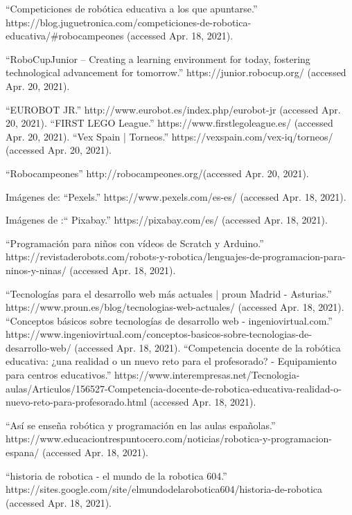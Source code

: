 \begin{thebibliography}{69}
	``Competiciones de robótica educativa a los que apuntarse.” https://blog.juguetronica.com/competiciones-de-robotica-educativa/\#robocampeones (accessed Apr. 18, 2021).

 ``RoboCupJunior – Creating a learning environment for today, fostering technological advancement for tomorrow.” https://junior.robocup.org/ (accessed Apr. 20, 2021).

	``EUROBOT JR.” http://www.eurobot.es/index.php/eurobot-jr (accessed Apr. 20, 2021).
 ``FIRST LEGO League.” https://www.firstlegoleague.es/ (accessed Apr. 20, 2021).
 ``Vex Spain | Torneos.” https://vexspain.com/vex-iq/torneos/ (accessed Apr. 20, 2021).

 ``Robocampeones”
http://robocampeones.org/(accessed Apr. 20, 2021).

 Imágenes de:	``Pexels.” https://www.pexels.com/es-es/ (accessed Apr. 18, 2021).

 Imágenes de :`` Pixabay.” https://pixabay.com/es/ (accessed Apr. 18, 2021).

\bibitem{}	``Programación para niños con vídeos de Scratch y Arduino.” https://revistaderobots.com/robots-y-robotica/lenguajes-de-programacion-para-ninos-y-ninas/ (accessed Apr. 18, 2021).

\bibitem{}	``Tecnologías para el desarrollo web más actuales | proun Madrid - Asturias.” https://www.proun.es/blog/tecnologias-web-actuales/ (accessed Apr. 18, 2021).
\bibitem{}	``Conceptos básicos sobre tecnologías de desarrollo web - ingeniovirtual.com.” https://www.ingeniovirtual.com/conceptos-basicos-sobre-tecnologias-de-desarrollo-web/ (accessed Apr. 18, 2021).
\bibitem{} ``Competencia docente de la robótica educativa: ¿una realidad o un nuevo reto para el profesorado? - Equipamiento para centros educativos.” https://www.interempresas.net/Tecnologia-aulas/Articulos/156527-Competencia-docente-de-robotica-educativa-realidad-o-nuevo-reto-para-profesorado.html (accessed Apr. 18, 2021).



\bibitem{}	``Así se enseña robótica y programación en las aulas españolas.” https://www.educaciontrespuntocero.com/noticias/robotica-y-programacion-espana/ (accessed Apr. 18, 2021).

 ``historia de robotica - el mundo de la robotica 604.” https://sites.google.com/site/elmundodelarobotica604/historia-de-robotica (accessed Apr. 18, 2021).


\end{thebibliography}
